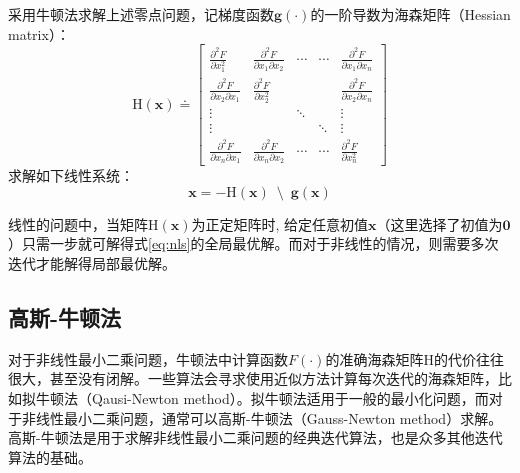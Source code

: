 采用牛顿法求解上述零点问题，记梯度函数$\bm{g}(\cdot)$的一阶导数为海森矩阵（Hessian matrix）：
\begin{equation}
    \mathrm{H}(\bm{x}) \doteq \begin{bmatrix}
        \frac{\partial^2 F}{\partial x_1^2} &
        \frac{\partial^2 F}{\partial x_1 \partial x_2} &
        \cdots & \cdots &
        \frac{\partial^2 F}{\partial x_1 \partial x_n} \\
        \frac{\partial^2 F}{\partial x_2 \partial x_1} &
        \frac{\partial^2 F}{\partial x_2^2} &
        & &
        \frac{\partial^2 F}{\partial x_2 \partial x_n} \\
        \vdots & & \ddots & & \vdots \\
        \vdots & & & \ddots & \vdots \\
        \frac{\partial^2 F}{\partial x_n \partial x_1} &
        \frac{\partial^2 F}{\partial x_n \partial x_2} &
        \cdots & \cdots &
        \frac{\partial^2 F}{\partial x_n^2}
    \end{bmatrix}
\end{equation}
求解如下线性系统：
\begin{equation}
    \bm{x} = -\mathrm{H}(\bm{x}) \enspace\setminus\enspace \bm{g}(\bm{x})
    \label{eq:linsys}
\end{equation}

线性的问题中，当矩阵$\mathrm{H}(\bm{x})$为正定矩阵时, 给定任意初值$\bm{x}$（这里选择了初值为$\bm{0}$）只需一步就可解得式\eqref{eq:nls}的全局最优解。而对于非线性的情况，则需要多次迭代才能解得局部最优解。

\subsection{高斯-牛顿法}\label{sec:gn}

对于非线性最小二乘问题，牛顿法中计算函数$F(\cdot)$的准确海森矩阵$\mathrm{H}$的代价往往很大，甚至没有闭解。一些算法会寻求使用近似方法计算每次迭代的海森矩阵，比如拟牛顿法\citep{tingleff2004methods}（Qausi-Newton method）。拟牛顿法适用于一般的最小化问题，而对于非线性最小二乘问题，通常可以高斯-牛顿法（Gauss-Newton method）求解。高斯-牛顿法是用于求解非线性最小二乘问题的经典迭代算法，也是众多其他迭代算法的基础。

